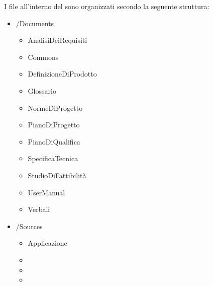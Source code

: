 					I file all’interno del  sono organizzati secondo la seguente struttura:
					\begin{itemize}
						\item /Documents
						\begin{itemize}
							\item AnalisiDeiRequisiti
							\item Commons
							\item DefinizioneDiProdotto
							\item Glossario
							\item NormeDiProgetto
							\item PianoDiProgetto
							\item PianoDiQualifica
							\item SpecificaTecnica
							\item StudioDiFattibilità
							\item UserManual
							\item Verbali
						\end{itemize}
						\item /Sources
						\begin{itemize}
							\item Applicazione
							\item {}
							\item {}
							\item {}
						\end{itemize}
					\end{itemize}


